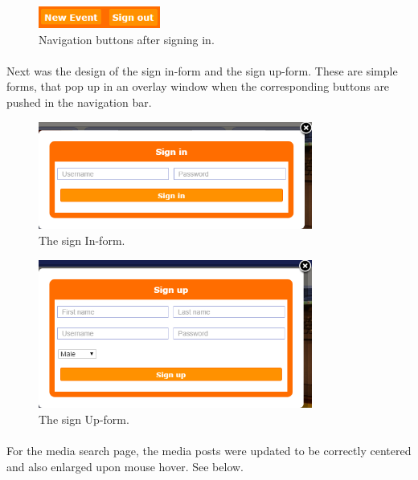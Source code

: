 \begin{figure}[ht!]
\centering
\includegraphics[width=40mm]{Sprint2/img/Sprint2-buttons2.png}
\caption{Navigation buttons after signing in. \label{overflow}}
\end{figure}

\paragraph{}
Next was the design of the sign in-form and the sign up-form. These are simple forms, that pop up in an overlay window when the corresponding buttons are pushed in the navigation bar. \\

\begin{figure}[ht!]
\centering
\includegraphics[width=90mm]{Sprint2/img/Sprint2-SignInForm.png}
\caption{The sign In-form. \label{overflow}}
\end{figure}

\begin{figure}[ht!]
\centering
\includegraphics[width=90mm]{Sprint2/img/Sprint2-SignUpForm.png}
\caption{The sign Up-form. \label{overflow}}
\end{figure}

\paragraph{} For the media search page, the media posts were updated to be correctly centered and also enlarged upon mouse hover. See below. 

